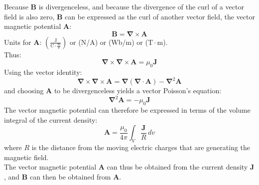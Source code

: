 Because $\mathbf{B}$ is divergenceless, and because the divergence of the curl of a vector field is also zero, $\mathbf{B}$ can be expressed as the curl of another vector field, the vector magnetic potential $\mathbf{A}$:
\begin{equation}\label{curl A}
\mathbf{B} = \mathbf{\nabla} \times \mathbf{A}
\end{equation}
Units for $\mathbf{A}$: $\left( \frac{\mathrm{J}}{\mathrm{C} \cdot \frac{\mathrm{m}}{\mathrm{s}}} \right)$ or (N/A) or (Wb/m) or ($\mathrm{T} \cdot \mathrm{m}$).\\
{\noindent}Thus:
\begin{equation}\label{curl curl A}
\mathbf{\nabla} \times \mathbf{\nabla} \times \mathbf{A} = \mu_0 \mathbf{J}
\end{equation}
{\noindent}Using the vector identity:
\begin{equation}\label{identity}
\mathbf{\nabla} \times \mathbf{\nabla} \times \mathbf{A} = \mathbf{\nabla} (\mathbf{\nabla} \cdot \mathbf{A}) - \mathbf{\nabla}^2 \mathbf{A}
\end{equation}
{\noindent}and choosing $\mathbf{A}$ to be divergenceless yields a vector Poisson's equation:
\begin{equation}\label{vector Poisson}
\mathbf{\nabla}^2 \mathbf{A} = -\mu_0\mathbf{J}
\end{equation}
{\noindent}The vector magnetic potential can therefore be expressed in terms of the volume integral of the current density:
\begin{equation}\label{A}
\mathbf{A} = \frac{\mu_0}{4 \pi} \int_V \frac{\mathbf{J}}{R}\,dv
\end{equation}
{\noindent}where $R$ is the distance from the moving electric charges that are generating the magnetic field.\\

The vector magnetic potential $\mathbf{A}$ can thus be obtained from the current density $\mathbf{J}$, and $\mathbf{B}$ can then be obtained from $\mathbf{A}$.\\

